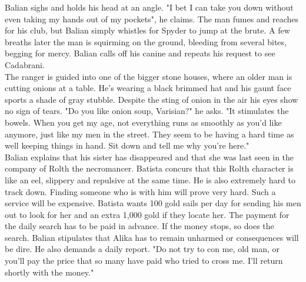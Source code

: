 Balian sighs and holds his head at an angle. "I bet I can take you down without even taking my hands out of my pockets", he claims. The man fumes and reaches for his club, but Balian simply whistles for Spyder to jump at the brute. A few breaths later the man is squirming on the ground, bleeding from several bites, begging for mercy. Balian calls off his canine and repeats his request to see Cadabrani.\\

The ranger is guided into one of the bigger stone houses, where an older man is cutting onions at a table. He's wearing a black brimmed hat and his gaunt face sports a shade of gray stubble. Despite the sting of onion in the air his eyes show no sign of tears. "Do you like onion soup, Varisian?" he asks. "It stimulates the bowels. When you get my age, not everything runs as smoothly as you'd like anymore, just like my men in the street. They seem to be having a hard time as well keeping things in hand. Sit down and tell me why you're here."\\

Balian explains that his sister has disappeared and that she was last seen in the company of Rolth the necromancer. Batista concurs that this Rolth character is like an eel, slippery and repulsive at the same time. He is also extremely hard to track down. Finding someone who is with him will prove very hard. Such a service will be expensive. Batista wants 100 gold sails per day for sending his men out to look for her and an extra 1,000 gold if they locate her. The payment for the daily search has to be paid in advance. If the money stops, so does the search. Balian stipulates that Alika has to remain unharmed or consequences will be dire. He also demands a daily report. "Do not try to con me, old man, or you'll pay the price that so many have paid who tried to cross me. I'll return shortly with the money."\\

